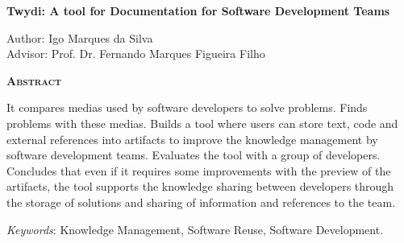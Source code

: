 \begin{center}
	{\Large{\textbf{Twydi: A tool for Documentation for Software Development Teams}}}
\end{center}

\vspace{1cm}

\begin{flushright}
	Author: Igo Marques da Silva\\
	Advisor: Prof. Dr. Fernando Marques Figueira Filho
\end{flushright}

\vspace{1cm}

\begin{center}
	\Large{\textsc{\textbf{Abstract}}}
\end{center}

\noindent It compares medias used by software developers to solve problems. Finds problems with these medias. Builds a tool where users can store text, code and external references into artifacts to improve the knowledge management by software development teams. Evaluates the tool with a group of developers. Concludes that even if it requires some improvements with the preview of the artifacts, the tool supports the knowledge sharing between developers through the storage of solutions and sharing of information and references to the team.

\noindent\textit{Keywords}: Knowledge Management, Software Reuse, Software Development.
